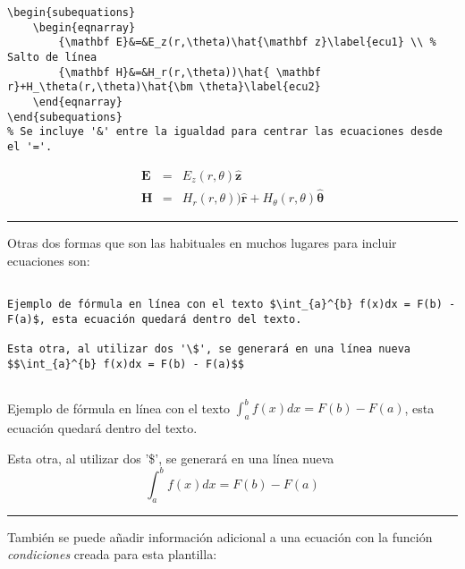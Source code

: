 \begin{lstlisting}[style=Latex-color,label=latex_code2]
\begin{subequations}
	\begin{eqnarray}
    	{\mathbf E}&=&E_z(r,\theta)\hat{\mathbf z}\label{ecu1} \\ % Salto de línea
    	{\mathbf H}&=&H_r(r,\theta))\hat{ \mathbf r}+H_\theta(r,\theta)\hat{\bm \theta}\label{ecu2}
	\end{eqnarray}
\end{subequations}
% Se incluye '&' entre la igualdad para centrar las ecuaciones desde el '='.
\end{lstlisting}

\begin{subequations}
  \begin{eqnarray}
    {\mathbf E}&=&E_z(r,\theta)\hat{\mathbf z}\label{ecu1} \\
    {\mathbf H}&=&H_r(r,\theta))\hat{ \mathbf r}+H_\theta(r,\theta)\hat{\bm
      \theta}\label{ecu2}
  \end{eqnarray}
\end{subequations}
\vspace{1em}
\noindent\hrule
\vspace{1em}
Otras dos formas que son las habituales en muchos lugares para incluir ecuaciones son:
\begin{lstlisting}[style=Latex-color,label=latex_code]

Ejemplo de fórmula en línea con el texto $\int_{a}^{b} f(x)dx = F(b) - F(a)$, esta ecuación quedará dentro del texto.

Esta otra, al utilizar dos '\$', se generará en una línea nueva $$\int_{a}^{b} f(x)dx = F(b) - F(a)$$
	
\end{lstlisting}

Ejemplo de fórmula en línea con el texto $\int_{a}^{b} f(x)dx = F(b) - F(a)$, esta ecuación quedará dentro del texto.

Esta otra, al utilizar dos '\$', se generará en una línea nueva $$\int_{a}^{b} f(x)dx = F(b) - F(a)$$
\vspace{1em}
\noindent\hrule
\vspace{1em}
También se puede añadir información adicional a una ecuación con la función \textit{condiciones} creada para esta plantilla:

